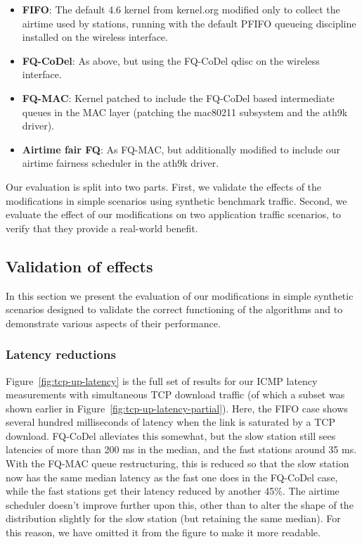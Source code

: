 \documentclass[english]{scrartcl}
\begin{document}
\begin{itemize}
\item \textbf{FIFO}: The default 4.6 kernel from kernel.org modified only to collect
the airtime used by stations, running with the default PFIFO queueing
discipline installed on the wireless interface.
\item \textbf{FQ-CoDel}: As above, but using the FQ-CoDel qdisc on the wireless interface.
\item \textbf{FQ-MAC}: Kernel patched to include the FQ-CoDel based intermediate queues in
the MAC layer (patching the mac80211 subsystem and the ath9k driver).
\item \textbf{Airtime fair FQ}: As FQ-MAC, but additionally modified to include our airtime
fairness scheduler in the ath9k driver.
\end{itemize}

Our evaluation is split into two parts. First, we validate the effects of the
modifications in simple scenarios using synthetic benchmark traffic. Second, we
evaluate the effect of our modifications on two application traffic scenarios,
to verify that they provide a real-world benefit.

\subsection{Validation of effects}
\label{sec:orgea833e2}
In this section we present the evaluation of our modifications in simple
synthetic scenarios designed to validate the correct functioning of the
algorithms and to demonstrate various aspects of their performance.

\subsubsection{Latency reductions}
\label{sec:orgdd60700}
Figure \ref{fig:tcp-up-latency} is the full set of results for our ICMP latency
measurements with simultaneous TCP download traffic (of which a subset was shown
earlier in Figure \ref{fig:tcp-up-latency-partial}). Here, the FIFO case shows several
hundred milliseconds of latency when the link is saturated by a TCP download.
FQ-CoDel alleviates this somewhat, but the slow station still sees latencies of
more than 200 ms in the median, and the fast stations around 35 ms. With the
FQ-MAC queue restructuring, this is reduced so that the slow station now has the
same median latency as the fast one does in the FQ-CoDel case, while the fast
stations get their latency reduced by another 45\%. The airtime scheduler doesn't
improve further upon this, other than to alter the shape of the distribution
slightly for the slow station (but retaining the same median). For this reason,
we have omitted it from the figure to make it more readable.
\end{document}
